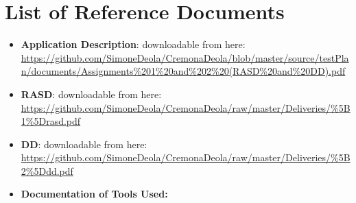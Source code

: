 \documentclass[../../../../testPlan.tex]{subfiles}
\begin{document}
	\section{List of Reference Documents}

		\begin{itemize}
			\item \textbf{Application Description}: downloadable from here: \url{https://github.com/SimoneDeola/CremonaDeola/blob/master/source/testPlan/documents/Assignments%201%20and%202%20(RASD%20and%20DD).pdf}

			\item \textbf{RASD}: downloadable from here: \url{https://github.com/SimoneDeola/CremonaDeola/raw/master/Deliveries/%5B1%5Drasd.pdf}

			\item \textbf{DD}: downloadable from here: \url{https://github.com/SimoneDeola/CremonaDeola/raw/master/Deliveries/%5B2%5Ddd.pdf}

			\item \textbf{Documentation of Tools Used:}
		\end{itemize}
\end{document}

